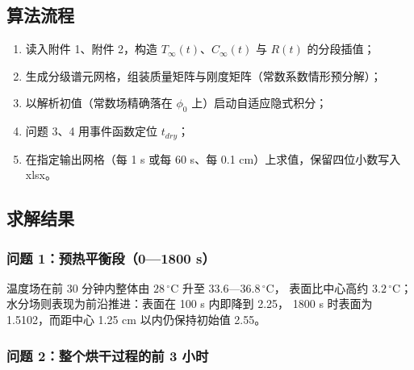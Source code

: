 \documentclass[12pt,a4paper]{ctexart}
\begin{document}
\subsection{算法流程}
\begin{enumerate}[label=\arabic*),leftmargin=1.8em,itemsep=1pt]
  \item 读入附件 1、附件 2，构造 $T_\infty(t)$、$C_\infty(t)$ 与 $R(t)$ 的分段插值；
  \item 生成分级谱元网格，组装质量矩阵与刚度矩阵（常数系数情形预分解）；
  \item 以解析初值（常数场精确落在 $\phi_0$ 上）启动自适应隐式积分；
  \item 问题 3、4 用事件函数定位 $t_{dry}$；
  \item 在指定输出网格（每 1 s 或每 60 s、每 0.1 cm）上求值，保留四位小数写入 xlsx。
\end{enumerate}

\subsection{求解结果}
\subsubsection{问题 1：预热平衡段（0—1800 s）}

\begin{table}[htbp]
\centering
\caption*{表 1 分钟内药材的温度（单位：$^\circ$C）}
\label{tab:1}
\small
\end{table}

\begin{table}[htbp]
\centering
\caption*{表 2 分钟内药材的水分浓度（单位：kg/kg）}
\label{tab:2}
\small
\end{table}

\noindent 温度场在前 30 分钟内整体由 $28\,^\circ$C 升至 $33.6$—$36.8\,^\circ$C，
表面比中心高约 $3.2\,^\circ$C；水分场则表现为前沿推进：表面在 100 s 内即降到 2.25，
1800 s 时表面为 1.5102，而距中心 1.25 cm 以内仍保持初始值 2.55。

\subsubsection{问题 2：整个烘干过程的前 3 小时}

\begin{table}[htbp]
\centering
\caption*{表 3 小时内药材的温度（单位：$^\circ$C）}
\label{tab:3}
\small
\end{table}
\end{document}

